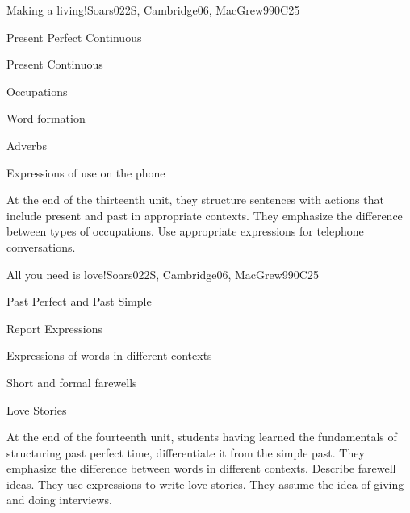 \begin{syllabus}
\begin{unit}{Making a living!}{}{Soars022S, Cambridge06, MacGrew99}{0}{C25}
   \begin{topics}
       \item Present Perfect Continuous
       \item Present Continuous
       \item Occupations
       \item Word formation
       \item Adverbs
       \item Expressions of use on the phone
   \end{topics}

   \begin{learningoutcomes}
      \item At the end of the thirteenth unit, they structure sentences with actions that include present and past in appropriate contexts. They emphasize the difference between types of occupations. Use appropriate expressions for telephone conversations.
   \end{learningoutcomes}
\end{unit}

\begin{unit}{All you need is love!}{}{Soars022S, Cambridge06, MacGrew99}{0}{C25}
   \begin{topics}
       \item Past Perfect and Past Simple
       \item Report Expressions
       \item Expressions of words in different contexts
       \item Short and formal farewells
       \item Love Stories
   \end{topics}

   \begin{learningoutcomes}
      \item At the end of the fourteenth unit, students having learned the fundamentals of structuring past perfect time, differentiate it from the simple past. They emphasize the difference between words in different contexts. Describe farewell ideas. They use expressions to write love stories. They assume the idea of giving and doing interviews.
   \end{learningoutcomes}
\end{unit}

\begin{coursebibliography}
\end{coursebibliography}

\end{syllabus}
%
